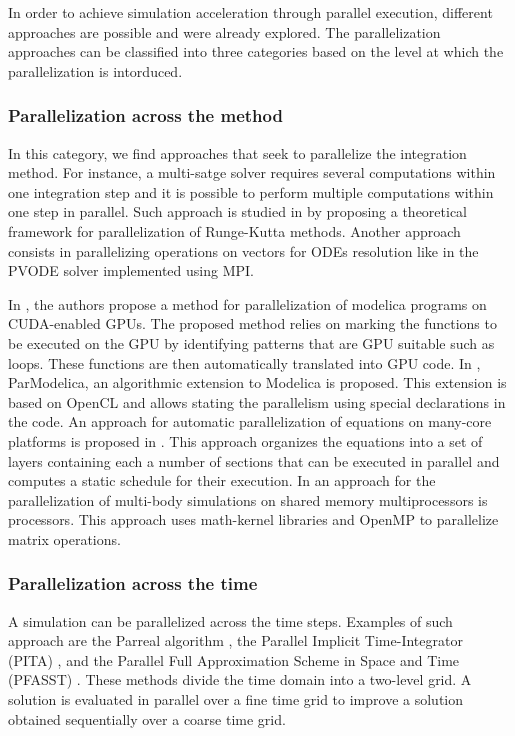In order to achieve simulation acceleration through parallel execution, different approaches are possible and were already explored. The parallelization approaches can be classified into three categories based on the level at which the parallelization is intorduced.

\subsubsection{Parallelization across the method}
In this category, we find approaches that seek to parallelize the integration method. For instance, a multi-satge solver requires several computations within one integration step and it is possible to perform multiple computations within one step in parallel. Such approach is studied in \cite{iserles:1990} by proposing a theoretical framework for parallelization of Runge-Kutta methods. Another approach consists in parallelizing operations on vectors for ODEs resolution like in the PVODE solver \cite{byrne:1999} implemented using MPI. 

In \cite{elmqvist:2015}, the authors propose a method for parallelization of modelica programs on CUDA-enabled GPUs. The proposed method relies on marking the functions to be executed on the GPU by identifying patterns that are GPU suitable such as loops. These functions are then automatically translated into GPU code. In \cite{Gebremedhin2012}, ParModelica, an algorithmic extension to Modelica is proposed. This extension is based on OpenCL and allows stating the parallelism using special declarations in the code. An approach for automatic parallelization of equations on many-core platforms is proposed in \cite{elmqvist:2014}. This approach organizes the equations into a set of layers containing each a number of sections that can be executed in parallel and computes a static schedule for their execution. In \cite{clauberg:2012} an approach for the parallelization of multi-body simulations on shared memory multiprocessors is processors. This approach uses math-kernel libraries and OpenMP to parallelize matrix operations.

\subsubsection{Parallelization across the time}

A simulation can be parallelized across the time steps. Examples of such approach are the Parreal algorithm \cite{lions:2001}, the Parallel Implicit Time-Integrator (PITA) \cite{farhat:2003}, and the Parallel Full Approximation Scheme in Space and Time (PFASST) \cite{emmett:2012}. These methods divide the time domain into a two-level grid. A solution is evaluated in parallel over a fine time grid to improve a solution obtained sequentially over a coarse time grid.
